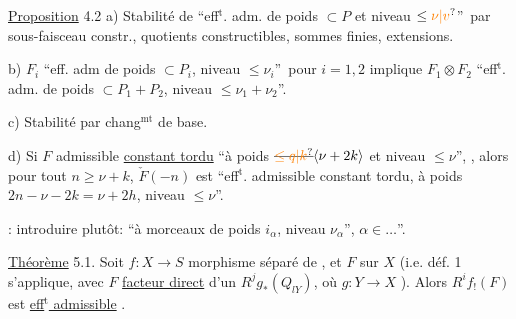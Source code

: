 \uline{Proposition} 4.2  a) Stabilité de \textquotedblleft eff$^{\mathrm t}$. adm. de poids $\subset P$ et niveau $\leq\unsure{\nu|v}$\textquotedblright\ par sous-faisceau constr., quotients constructibles, sommes finies, extensions.

b) $F_i$ \textquotedblleft eff. adm de poids $\subset P_i$, niveau $\leq\nu_i$\textquotedblright\ pour $i=1,2$ implique $F_1\otimes F_2$ \textquotedblleft eff$^{\mathrm t}$. adm. de poids $\subset P_1+P_2$, niveau $\leq\nu_1+\nu_2$\textquotedblright.

c) Stabilité par chang$^{\mathrm{mt}}$ de base.

d) Si $F$  admissible \uline{constant tordu} \textquotedblleft à poids $\deleted{\unsure{\leq q|k}}\inserted{\nu+2k}$ et niveau $\leq\nu$\textquotedblright, , alors pour tout $n\geq\nu+k$, $\check F(-n)$ est \textquotedblleft eff$^{\mathrm t}$. admissible constant tordu, à poids $2n-\nu-2k=\nu+2h$, niveau $\leq\nu$\textquotedblright.

\uline{}: introduire plutôt: \textquotedblleft à morceaux de poids $i_\alpha$, niveau $\nu_\alpha$\textquotedblright, $\alpha\in\ldots$\textquotedblright.

\uline{Théorème} 5.1. Soit $f:X\longrightarrow S$ morphisme séparé de , et $F$  sur $X$ (i.e. déf. 1 s'applique, avec $F$ \uline{facteur direct} d'un $R^jg_*(Q_{lY})$, où $g:Y\longrightarrow X$ ).  Alors $R^if_!(F)$ est \uline{eff$^{\mathrm t}$ admissible}  .

